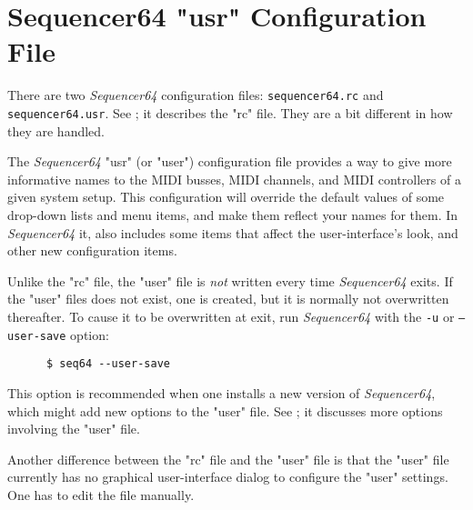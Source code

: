 %
%
%

\section{Sequencer64 "usr" Configuration File}
\label{sec:seq64_usr_file}

   There are two \textsl{Sequencer64} configuration files:
   \texttt{sequencer64.rc} and \texttt{sequencer64.usr}.
   See ; it describes the "rc" file.
   They are a bit different in how they are handled.

   The \textsl{Sequencer64} "usr" (or "user")
   configuration file provides a way to give more
   informative names to the MIDI busses, MIDI channels, and MIDI controllers of
   a given system setup.  This configuration will override the default values
   of some drop-down lists and menu items, and make them reflect your names for
   them.  In \textsl{Sequencer64} it, also includes some items that affect the
   user-interface's look, and other new configuration items.

   Unlike the "rc" file, the "user" file is \textsl{not} written every time
   \textsl{Sequencer64} exits.  If the "user" files does not exist, one is
   created, but it is normally not overwritten thereafter.  To
   cause it to be overwritten at exit, run \textsl{Sequencer64} with the
   \texttt{-u} or \texttt{--user-save} option:

   \begin{verbatim}
      $ seq64 --user-save
   \end{verbatim}

   This option is recommended when one installs a new version of
   \textsl{Sequencer64}, which might add new options to the "user" file.
   See ; it discusses more options involving the
   "user" file.

   Another difference between the "rc" file and the "user" file is that
   the "user" file currently has no graphical user-interface dialog to
   configure the "user" settings.  One has to edit the file manually.

